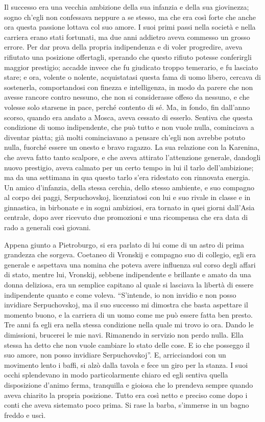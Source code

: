 Il successo era una vecchia ambizione della sua infanzia e della sua giovinezza; sogno ch'egli non confessava neppure a se stesso, ma che era così forte che anche ora questa passione lottava col suo amore. I suoi primi passi nella società e nella carriera erano stati fortunati, ma due anni addietro aveva commesso un grosso errore. Per dar prova della propria indipendenza e di voler progredire, aveva rifiutato una posizione offertagli, sperando che questo rifiuto potesse conferirgli maggior prestigio; accadde invece che fu giudicato troppo temerario, e fu lasciato stare; e ora, volente o nolente, acquistatasi questa fama di uomo libero, cercava di sostenerla, comportandosi con finezza e intelligenza, in modo da parere che non avesse rancore contro nessuno, che non si considerasse offeso da nessuno, e che volesse solo starsene in pace, perché contento di sé. Ma, in fondo, fin dall'anno scorso, quando era andato a Mosca, aveva cessato di esserlo. Sentiva che questa condizione di uomo indipendente, che può tutto e non vuole nulla, cominciava a diventar piatta; già molti cominciavano a pensare ch'egli non avrebbe potuto nulla, fuorché essere un onesto e bravo ragazzo. La sua relazione con la Karenina, che aveva fatto tanto scalpore, e che aveva attirato l'attenzione generale, dandogli nuovo prestigio, aveva calmato per un certo tempo in lui il tarlo dell'ambizione; ma da una settimana in qua questo tarlo s'era ridestato con rinnovata energia. Un amico d'infanzia, della stessa cerchia, dello stesso ambiente, e suo compagno al corpo dei paggi, Serpuchovskoj, licenziatosi con lui e suo rivale in classe e in ginnastica, in birbonate e in sogni ambiziosi, era tornato in quei giorni dall'Asia centrale, dopo aver ricevuto due promozioni e una ricompensa che era data di rado a generali così giovani. 

Appena giunto a Pietroburgo, si era parlato di lui come di un astro di prima grandezza che sorgeva. Coetaneo di Vronskij e compagno suo di collegio, egli era generale e aspettava una nomina che poteva avere influenza sul corso degli affari di stato, mentre lui, Vronskij, sebbene indipendente e brillante e amato da una donna deliziosa, era un semplice capitano al quale si lasciava la libertà di essere indipendente quanto e come voleva. ``S'intende, io non invidio e non posso invidiare Serpuchovskoj, ma il suo successo mi dimostra che basta aspettare il momento buono, e la carriera di un uomo come me può essere fatta ben presto. Tre anni fa egli era nella stessa condizione nella quale mi trovo io ora. Dando le dimissioni, brucerei le mie navi. Rimanendo in servizio non perdo nulla. Ella stessa ha detto che non vuole cambiare lo stato delle cose. E io che posseggo il suo amore, non posso invidiare Serpuchovskoj''. E, arricciandosi con un movimento lento i baffi, si alzò dalla tavola e fece un giro per la stanza. I suoi occhi splendevano in modo particolarmente chiaro ed egli sentiva quella disposizione d'animo ferma, tranquilla e gioiosa che lo prendeva sempre quando aveva chiarito la propria posizione. Tutto era così netto e preciso come dopo i conti che aveva sistemato poco prima. Si rase la barba, s'immerse in un bagno freddo e uscì. 

